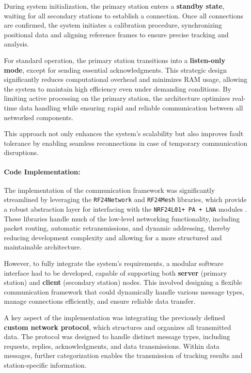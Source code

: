 During system initialization, the primary station enters a \textbf{standby state}, waiting for all secondary stations to establish a connection. Once all connections are confirmed, the system initiates a calibration procedure, synchronizing positional data and aligning reference frames to ensure precise tracking and analysis.  

For standard operation, the primary station transitions into a \textbf{listen-only mode}, except for sending essential acknowledgments. This strategic design significantly reduces computational overhead and minimizes RAM usage, allowing the system to maintain high efficiency even under demanding conditions. By limiting active processing on the primary station, the architecture optimizes real-time data handling while ensuring rapid and reliable communication between all networked components.  

This approach not only enhances the system's scalability but also improves fault tolerance by enabling seamless reconnections in case of temporary communication disruptions.  

\paragraph{Code Implementation:}  
The implementation of the communication framework was significantly streamlined by leveraging the \texttt{RF24Network} and \texttt{RF24Mesh} libraries, which provide a robust abstraction layer for interfacing with the \texttt{NRF24L01+ PA + LNA} modules \cite{nRF24L01_plus}. These libraries handle much of the low-level networking functionality, including packet routing, automatic retransmissions, and dynamic addressing, thereby reducing development complexity and allowing for a more structured and maintainable architecture.  

However, to fully integrate the system’s requirements, a modular software interface had to be developed, capable of supporting both \textbf{server} (primary station) and \textbf{client} (secondary station) nodes. This involved designing a flexible communication framework that could dynamically handle various message types, manage connections efficiently, and ensure reliable data transfer.  

A key aspect of the implementation was integrating the previously defined \textbf{custom network protocol}, which structures and organizes all transmitted data. The protocol was designed to handle distinct message types, including requests, replies, acknowledgments, and data transmissions. Within data messages, further categorization enables the transmission of tracking results and station-specific information.  

